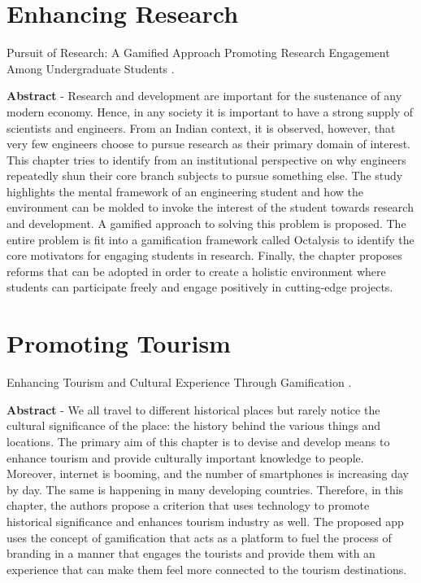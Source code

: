 \documentclass[
]{book}
\begin{document}
\hypertarget{enhancing-research}{%
\section{Enhancing Research}\label{enhancing-research}}

Pursuit of Research: A Gamified Approach Promoting Research Engagement Among Undergraduate Students \citep{mukherjee_pursuit_2019}.

\textbf{Abstract} - Research and development are important for the sustenance of any modern economy. Hence, in any society it is important to have a strong supply of scientists and engineers. From an Indian context, it is observed, however, that very few engineers choose to pursue research as their primary domain of interest. This chapter tries to identify from an institutional perspective on why engineers repeatedly shun their core branch subjects to pursue something else. The study highlights the mental framework of an engineering student and how the environment can be molded to invoke the interest of the student towards research and development. A gamified approach to solving this problem is proposed. The entire problem is fit into a gamification framework called Octalysis to identify the core motivators for engaging students in research. Finally, the chapter proposes reforms that can be adopted in order to create a holistic environment where students can participate freely and engage positively in cutting-edge projects.

\hypertarget{promoting-tourism}{%
\section{Promoting Tourism}\label{promoting-tourism}}

Enhancing Tourism and Cultural Experience Through Gamification \citep{setia_enhancing_2019}.

\textbf{Abstract} - We all travel to different historical places but rarely notice the cultural significance of the place: the history behind the various things and locations. The primary aim of this chapter is to devise and develop means to enhance tourism and provide culturally important knowledge to people. Moreover, internet is booming, and the number of smartphones is increasing day by day. The same is happening in many developing countries. Therefore, in this chapter, the authors propose a criterion that uses technology to promote historical significance and enhances tourism industry as well. The proposed app uses the concept of gamification that acts as a platform to fuel the process of branding in a manner that engages the tourists and provide them with an experience that can make them feel more connected to the tourism destinations.

  
\end{document}
